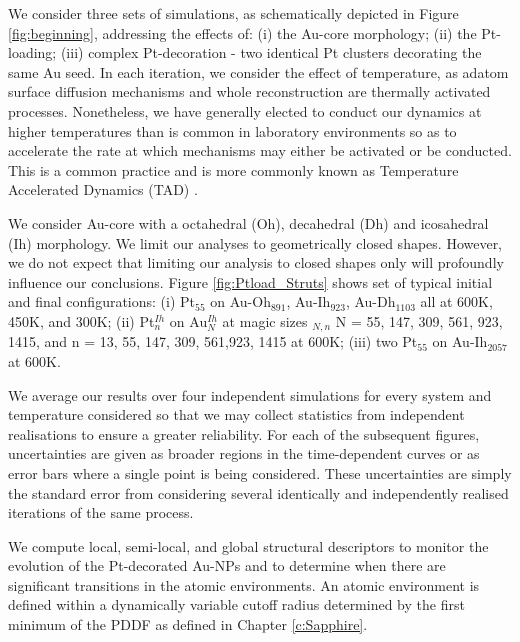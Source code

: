 We consider three sets of simulations, as schematically depicted in Figure \ref{fig:beginning}, addressing the effects of: (i) the Au-core morphology; (ii) the Pt-loading; (iii) complex Pt-decoration - two identical Pt clusters decorating the same Au seed. In each iteration, we consider the effect of temperature, as adatom surface diffusion mechanisms and whole reconstruction are thermally activated processes. Nonetheless, we have generally elected to conduct our dynamics at higher temperatures than is common in laboratory environments \cite{Jorge2019,Jorge2021,JorgeStructure} so as to accelerate the rate at which mechanisms may either be activated or be conducted. This is a common practice and is more commonly known as Temperature Accelerated Dynamics (TAD) \cite{doi:10.1146/annurev-chembioeng-080615-033608}. 
%

We consider Au-core with a octahedral (Oh), decahedral (Dh) and icosahedral (Ih) morphology. We limit our analyses to geometrically closed shapes. However, we do not expect that limiting our analysis to closed shapes only will profoundly influence our conclusions. Figure  \ref{fig:Ptload_Struts} shows set of typical initial and final configurations: (i) Pt$_{55}$ on Au-Oh$_{891}$, Au-Ih$_{923}$, Au-Dh$_{1103}$ all at 600K, 450K, and 300K; (ii) Pt$^{Ih}_{n}$ on Au$^{Ih}_{N}$ at magic sizes $_{N,n}$ N = 55, 147, 309, 561, 923, 1415, and n = 13, 55, 147, 309, 561,923, 1415 at 600K; (iii) two Pt$_{55}$ on Au-Ih$_{2057}$ at 600K.

We average our results over four independent simulations for every system and temperature considered so that we may collect statistics from independent realisations to ensure a greater reliability. For each of the subsequent figures, uncertainties are given as broader regions in the time-dependent curves or as error bars where a single point is being considered. These uncertainties are simply the standard error from considering several identically and independently realised iterations of the same process.

We compute local, semi-local, and global structural descriptors to monitor the evolution of the Pt-decorated Au-NPs and to determine when there are significant transitions in the atomic environments. An atomic environment is defined within a dynamically variable cutoff radius determined by the first minimum of the PDDF as defined in Chapter \ref{c:Sapphire}.

